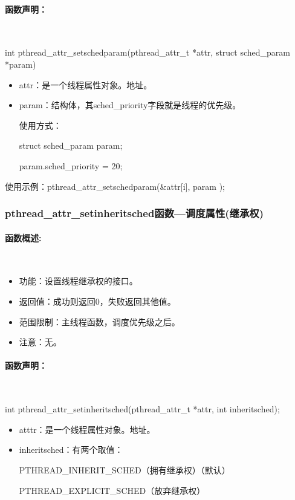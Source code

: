 \documentclass[UTF8]{article}%
\begin{document}
\paragraph{函数声明：}~{}

int pthread\_attr\_setschedparam(pthread\_attr\_t *attr, struct sched\_param *param)

\begin{itemize}
    \item attr：是一个线程属性对象。地址。
    \item param：结构体，其sched\_priority字段就是线程的优先级。
    
    使用方式：
    
    struct sched\_param param;  

    param.sched\_priority = 20;  

\end{itemize}

使用示例：pthread\_attr\_setschedparam(\&attr[i], param ); 

\subsubsection{pthread\_attr\_setinheritsched函数---调度属性(继承权)}

\paragraph{函数概述:}~{}

\begin{itemize}
    \item 功能：设置线程继承权的接口。
    \item 返回值：成功则返回0，失败返回其他值。
    \item 范围限制：主线程函数，调度优先级之后。
    \item 注意：无。
\end{itemize}

\paragraph{函数声明：}~{}

int pthread\_attr\_setinheritsched(pthread\_attr\_t *attr, int inheritsched);  

\begin{itemize}
    \item atttr：是一个线程属性对象。地址。
    \item inheritsched：有两个取值：
    
    PTHREAD\_INHERIT\_SCHED（拥有继承权）（默认）
    
    PTHREAD\_EXPLICIT\_SCHED（放弃继承权）

\end{itemize}
\end{document}
